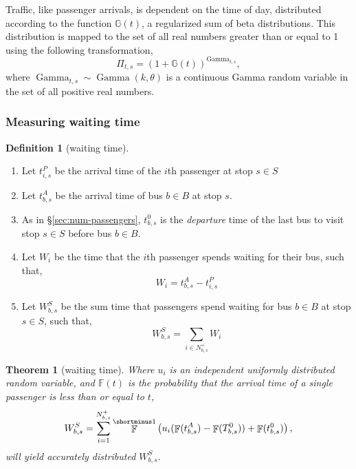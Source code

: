 \documentclass[12pt]{article}
\newtheorem{theorem}{Theorem}
\theoremstyle{definition}
\newtheorem{definition}{Definition}
\DeclareMathOperator{\Gam}{Gamma}
\DeclareMathOperator{\F}{\mathbb F}
\newcommand{\inv}[1]{#1^{\shortminus 1}}
\begin{document}
Traffic, like passenger arrivals, is dependent on the time of day, distributed
according to the function $\mathbb G(t)$, a regularized sum of beta
distributions. This distribution is mapped to the set of all real numbers
greater than or equal to 1 using the following transformation,
\[
    \Pi_{t,s} = (1 + \mathbb G(t))^{\Gam_{t,s}},
\]
where $\Gam_{t,s} \sim \Gam(k, \theta)$ is a continuous Gamma random variable in
the set of all positive real numbers.

\subsubsection{Measuring waiting time}
\label{sec:waiting-time}

\begin{definition}[waiting time]
    \hfill
    \begin{enumerate}
        \item Let $t^P_{i,s}$ be the arrival time of the $i$th passenger at stop
            $s \in S$
        \item Let $t^A_{b,s}$ be the arrival time of bus $b \in
            B$ at stop $s$.
        \item As in \S \ref{sec:num-passengers}, $t^0_{b,s}$ is the
            \emph{departure} time of the last bus to visit stop $s \in S$
            before bus $b \in B$.
        \item Let $W_i$ be the time that the $i$th passenger spends waiting
            for their bus, such that,
            \[
                W_i = t^A_{b,s} - t^P_{i,s}
            \]
        \item Let $W^S_{b,s}$ be the sum time that passengers spend waiting
            for bus $b \in B$ at stop $s \in S$, such that,
            \[
                W^S_{b,s} = \sum_{i \in N^+_{b,s}} W_i
            \]
    \end{enumerate}
    \label{def:waiting-time}
\end{definition}

\begin{theorem}[waiting time]
    Where $u_i$ is an independent uniformly distributed random variable, and
    $\mathbb F(t)$ is the probability that the arrival time of a single
    passenger is less than or equal to $t$,
    \[
        W^S_{b,s} = \sum_{i=1}^{N^+_{b,s}}
        \inv\F\left(
            u_i(\F(t^A_{b,s}) - \F(T^0_{b,s}))
            + \F(t^0_{b,s})
            \right),
    \]
    will yield accurately distributed $W^S_{b,s}$.
    \label{thm:waiting-time}
\end{theorem}
\end{document}
